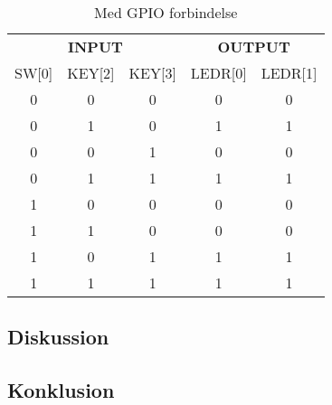 \documentclass[../journal2.tex]{subfiles}
\begin{document}
\begin{table}[!hbt]
    \begin{tabular}{ccc|cc}
    \multicolumn{3}{c}{\textbf{INPUT}} & 
    \multicolumn{2}{c}{\textbf{OUTPUT}} \\
    SW{[}0{]} & KEY{[}2{]} & KEY{[}3{]} & LEDR{[}0{]} & LEDR{[}1{]} \\ \hline
    0         & 0          & 0          & 0           & 0           \\
    0         & 1          & 0          & 1           & 1           \\
    0         & 0          & 1          & 0           & 0           \\
    0         & 1          & 1          & 1           & 1           \\
    1         & 0          & 0          & 0           & 0           \\
    1         & 1          & 0          & 0           & 0           \\
    1         & 0          & 1          & 1           & 1           \\
    1         & 1          & 1          & 1           & 1          
    \end{tabular}
    \centering
    \caption{Med GPIO forbindelse}
\end{table}

\subsection{Diskussion}

\subsection{Konklusion}
\end{document}

